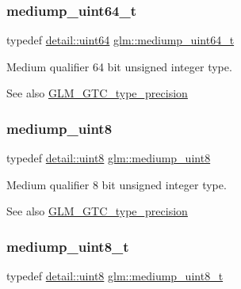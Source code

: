 \subsubsection{\texorpdfstring{mediump\+\_\+uint64\+\_\+t}{mediump\_uint64\_t}}
{\footnotesize\ttfamily typedef \mbox{\hyperlink{namespaceglm_1_1detail_adec4b19bf4982125e122db2fe03c5810}{detail\+::uint64}} \mbox{\hyperlink{group__gtc__type__precision_gaa97354d3120a6dc029a5e9563723de18}{glm\+::mediump\+\_\+uint64\+\_\+t}}}

Medium qualifier 64 bit unsigned integer type. \begin{DoxySeeAlso}{See also}
\mbox{\hyperlink{group__gtc__type__precision}{G\+L\+M\+\_\+\+G\+T\+C\+\_\+type\+\_\+precision}} 
\end{DoxySeeAlso}
\mbox{\label{group__gtc__type__precision_gac4b849eaac0543a10f97f4bdda4850a8}} 
\subsubsection{\texorpdfstring{mediump\+\_\+uint8}{mediump\_uint8}}
{\footnotesize\ttfamily typedef \mbox{\hyperlink{namespaceglm_1_1detail_aef2588f97d090cc19fbbe0c74fe17c8f}{detail\+::uint8}} \mbox{\hyperlink{group__gtc__type__precision_gac4b849eaac0543a10f97f4bdda4850a8}{glm\+::mediump\+\_\+uint8}}}

Medium qualifier 8 bit unsigned integer type. \begin{DoxySeeAlso}{See also}
\mbox{\hyperlink{group__gtc__type__precision}{G\+L\+M\+\_\+\+G\+T\+C\+\_\+type\+\_\+precision}} 
\end{DoxySeeAlso}
\mbox{\label{group__gtc__type__precision_gadfa38f3c245d371c4b2079f1fd68928b}} 
\subsubsection{\texorpdfstring{mediump\+\_\+uint8\+\_\+t}{mediump\_uint8\_t}}
{\footnotesize\ttfamily typedef \mbox{\hyperlink{namespaceglm_1_1detail_aef2588f97d090cc19fbbe0c74fe17c8f}{detail\+::uint8}} \mbox{\hyperlink{group__gtc__type__precision_gadfa38f3c245d371c4b2079f1fd68928b}{glm\+::mediump\+\_\+uint8\+\_\+t}}}

